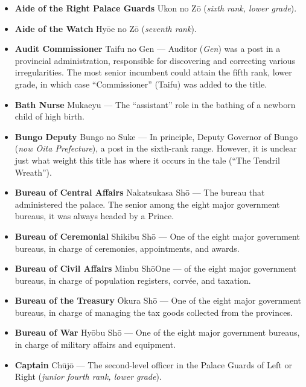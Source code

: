 \documentclass{article}
\begin{document}
\begin{multicols}{2}
\begin{small}
\begin{itemize}[
				label=,
				leftmargin=0em,
				rightmargin=-1.5em,
				itemindent=-2em,
			]
			\item \textbf{Aide of the Right Palace Guards} Ukon no Zō (\textit{sixth rank, lower grade}).

			\item \textbf{Aide of the Watch} Hyōe no Zō (\textit{seventh rank}).

			\item \textbf{Audit Commissioner} Taifu no Gen --- Auditor (\textit{Gen}) was a post in a provincial administration, responsible for discovering and correcting various irregularities. The most senior incumbent could attain the fifth rank, lower grade, in which case “Commissioner” (Taifu) was added to the title.

			\item \textbf{Bath Nurse} Mukaeyu --- The “assistant” role in the bathing of a newborn child of high birth.

			\item \textbf{Bungo Deputy} Bungo no Suke --- In principle, Deputy Governor of Bungo (\textit{now Ōita Prefecture}), a post in the sixth-rank range. However, it is unclear just what weight this title has where it occurs in the tale (“The Tendril Wreath”).

			\item \textbf{Bureau of Central Affairs} Nakatsukasa Shō --- The bureau that administered the palace. The senior among the eight major government bureaus, it was always headed by a Prince.

			\item \textbf{Bureau of Ceremonial} Shikibu Shō --- One of the eight major government bureaus, in charge of ceremonies, appointments, and awards.

			\item \textbf{Bureau of Civil Affairs} Minbu ShōOne --- of the eight major government bureaus, in charge of population registers, corvée, and taxation.

			\item \textbf{Bureau of the Treasury} Ōkura Shō --- One of the eight major government bureaus, in charge of managing the tax goods collected from the provinces.

			\item \textbf{Bureau of War} Hyōbu Shō --- One of the eight major government bureaus, in charge of military affairs and equipment.

			\item \textbf{Captain} Chūjō --- The second-level officer in the Palace Guards of Left or Right (\textit{junior fourth rank, lower grade}).


\end{itemize}
\end{small}
\end{multicols}
\end{document}
